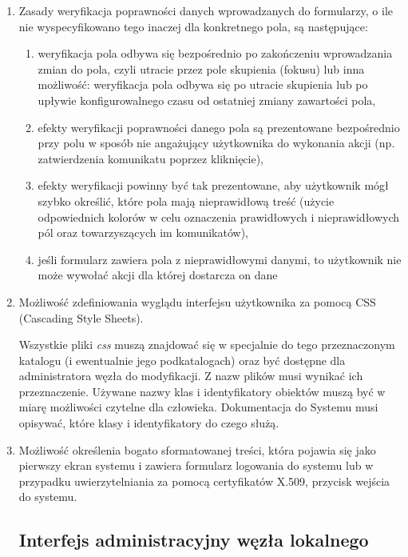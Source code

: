 \documentclass[a4paper]{report}
\begin{document}
\begin{enumerate}
  \item Zasady weryfikacja poprawności danych wprowadzanych do formularzy, o ile
  nie wyspecyfikowano tego inaczej dla konkretnego pola, są następujące:
  \begin{enumerate}
    \item weryfikacja pola odbywa się bezpośrednio po zakończeniu wprowadzania zmian do pola, czyli utracie przez pole skupienia (fokusu)
    lub inna możliwość: weryfikacja pola odbywa się po utracie skupienia lub po upływie konfigurowalnego czasu od ostatniej zmiany zawartości pola,
    \item efekty weryfikacji poprawności danego pola są prezentowane bezpośrednio przy polu w sposób nie angażujący użytkownika do wykonania
    akcji (np. zatwierdzenia komunikatu poprzez kliknięcie),
    \item efekty weryfikacji powinny być tak prezentowane, aby użytkownik mógł szybko określić, które pola mają
    nieprawidłową treść (użycie odpowiednich kolorów w celu oznaczenia prawidłowych i nieprawidłowych pól oraz towarzyszących
    im komunikatów),
    \item jeśli formularz zawiera pola z nieprawidłowymi danymi, to użytkownik nie może wywołać akcji dla której dostarcza on dane
  \end{enumerate}

  \item Możliwość zdefiniowania wyglądu interfejsu użytkownika za pomocą CSS (Cascading Style Sheets).

  Wszystkie pliki \emph{css} muszą znajdować się w specjalnie do tego przeznaczonym katalogu (i ewentualnie
  jego podkatalogach) oraz być dostępne dla administratora węzła do modyfikacji. Z nazw plików musi wynikać
  ich przeznaczenie. Używane nazwy klas i identyfikatory obiektów muszą być w miarę możliwości czytelne
  dla człowieka. Dokumentacja do Systemu musi opisywać, które klasy i identyfikatory do czego służą.

  \item Możliwość określenia bogato sformatowanej treści, która pojawia się jako pierwszy ekran systemu
  i zawiera formularz logowania do systemu lub w przypadku uwierzytelniania za pomocą certyfikatów X.509,
  przycisk wejścia do systemu.

\subsection{Interfejs administracyjny węzła lokalnego}


\end{enumerate}
\end{document}
